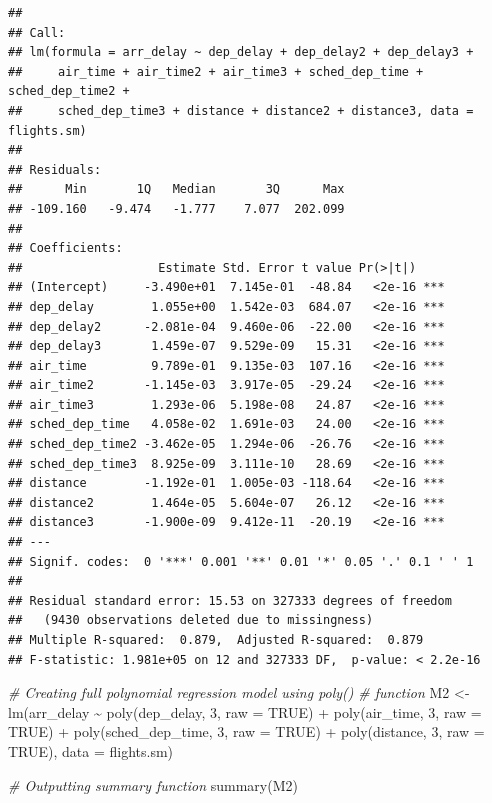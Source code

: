\documentclass[
]{article}
\newenvironment{Shaded}{\begin{snugshade}}{\end{snugshade}}
\newcommand{\AttributeTok}[1]{\textcolor[rgb]{0.77,0.63,0.00}{#1}}
\newcommand{\CommentTok}[1]{\textcolor[rgb]{0.56,0.35,0.01}{\textit{#1}}}
\newcommand{\ConstantTok}[1]{\textcolor[rgb]{0.00,0.00,0.00}{#1}}
\newcommand{\DecValTok}[1]{\textcolor[rgb]{0.00,0.00,0.81}{#1}}
\newcommand{\FunctionTok}[1]{\textcolor[rgb]{0.00,0.00,0.00}{#1}}
\newcommand{\NormalTok}[1]{#1}
\newcommand{\OtherTok}[1]{\textcolor[rgb]{0.56,0.35,0.01}{#1}}
\newcommand{\SpecialCharTok}[1]{\textcolor[rgb]{0.00,0.00,0.00}{#1}}
\begin{document}
\begin{verbatim}
## 
## Call:
## lm(formula = arr_delay ~ dep_delay + dep_delay2 + dep_delay3 + 
##     air_time + air_time2 + air_time3 + sched_dep_time + sched_dep_time2 + 
##     sched_dep_time3 + distance + distance2 + distance3, data = flights.sm)
## 
## Residuals:
##      Min       1Q   Median       3Q      Max 
## -109.160   -9.474   -1.777    7.077  202.099 
## 
## Coefficients:
##                   Estimate Std. Error t value Pr(>|t|)    
## (Intercept)     -3.490e+01  7.145e-01  -48.84   <2e-16 ***
## dep_delay        1.055e+00  1.542e-03  684.07   <2e-16 ***
## dep_delay2      -2.081e-04  9.460e-06  -22.00   <2e-16 ***
## dep_delay3       1.459e-07  9.529e-09   15.31   <2e-16 ***
## air_time         9.789e-01  9.135e-03  107.16   <2e-16 ***
## air_time2       -1.145e-03  3.917e-05  -29.24   <2e-16 ***
## air_time3        1.293e-06  5.198e-08   24.87   <2e-16 ***
## sched_dep_time   4.058e-02  1.691e-03   24.00   <2e-16 ***
## sched_dep_time2 -3.462e-05  1.294e-06  -26.76   <2e-16 ***
## sched_dep_time3  8.925e-09  3.111e-10   28.69   <2e-16 ***
## distance        -1.192e-01  1.005e-03 -118.64   <2e-16 ***
## distance2        1.464e-05  5.604e-07   26.12   <2e-16 ***
## distance3       -1.900e-09  9.412e-11  -20.19   <2e-16 ***
## ---
## Signif. codes:  0 '***' 0.001 '**' 0.01 '*' 0.05 '.' 0.1 ' ' 1
## 
## Residual standard error: 15.53 on 327333 degrees of freedom
##   (9430 observations deleted due to missingness)
## Multiple R-squared:  0.879,  Adjusted R-squared:  0.879 
## F-statistic: 1.981e+05 on 12 and 327333 DF,  p-value: < 2.2e-16
\end{verbatim}

\begin{Shaded}
\begin{Highlighting}[]
\CommentTok{\# Creating full polynomial regression model using poly()}
\CommentTok{\# function}
\NormalTok{M2 }\OtherTok{\textless{}{-}} \FunctionTok{lm}\NormalTok{(arr\_delay }\SpecialCharTok{\textasciitilde{}} \FunctionTok{poly}\NormalTok{(dep\_delay, }\DecValTok{3}\NormalTok{, }\AttributeTok{raw =} \ConstantTok{TRUE}\NormalTok{) }\SpecialCharTok{+} \FunctionTok{poly}\NormalTok{(air\_time,}
    \DecValTok{3}\NormalTok{, }\AttributeTok{raw =} \ConstantTok{TRUE}\NormalTok{) }\SpecialCharTok{+} \FunctionTok{poly}\NormalTok{(sched\_dep\_time, }\DecValTok{3}\NormalTok{, }\AttributeTok{raw =} \ConstantTok{TRUE}\NormalTok{) }\SpecialCharTok{+} \FunctionTok{poly}\NormalTok{(distance,}
    \DecValTok{3}\NormalTok{, }\AttributeTok{raw =} \ConstantTok{TRUE}\NormalTok{), }\AttributeTok{data =}\NormalTok{ flights.sm)}

\CommentTok{\# Outputting summary function}
\FunctionTok{summary}\NormalTok{(M2)}
\end{Highlighting}
\end{Shaded}
\end{document}
